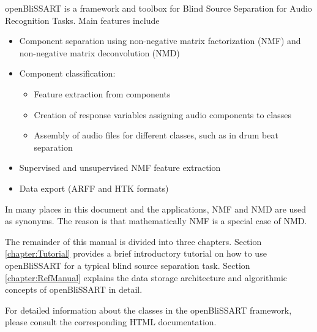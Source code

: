 %
%


openBliSSART is a framework and toolbox for Blind Source Separation for Audio
Recognition Tasks. Main features include

\begin{itemize}
\item Component separation using non-negative matrix factorization (NMF)
  \cite{LeeSeung1999,Smaragdis2003,LeeSeung2001} and non-negative matrix deconvolution
  (NMD) \cite{Smaragdis2004}
\item Component classification:
\begin{itemize}
    \item Feature extraction from components
    \item Creation of response variables assigning audio components to classes
    \item Assembly of audio files for different
    classes, such as in drum beat separation \cite{Virtanen2005}
\end{itemize}
\item Supervised and unsupervised NMF feature extraction
\item Data export (ARFF \cite{Weka} and HTK \cite{HTKBook} formats)
\end{itemize}

\begin{leftbar}
In many places in this document and the applications, NMF and NMD are used
as synonyms. The reason is that mathematically NMF is a special case of NMD.
\end{leftbar}

The remainder of this manual is divided into three chapters. Section \ref{chapter:Tutorial} provides
a brief introductory tutorial on how to use openBliSSART for a typical blind
source separation task. Section \ref{chapter:RefManual} explains the data storage architecture and algorithmic concepts of openBliSSART in detail.

For detailed information about the classes in the openBliSSART framework, please consult the
corresponding HTML documentation.

